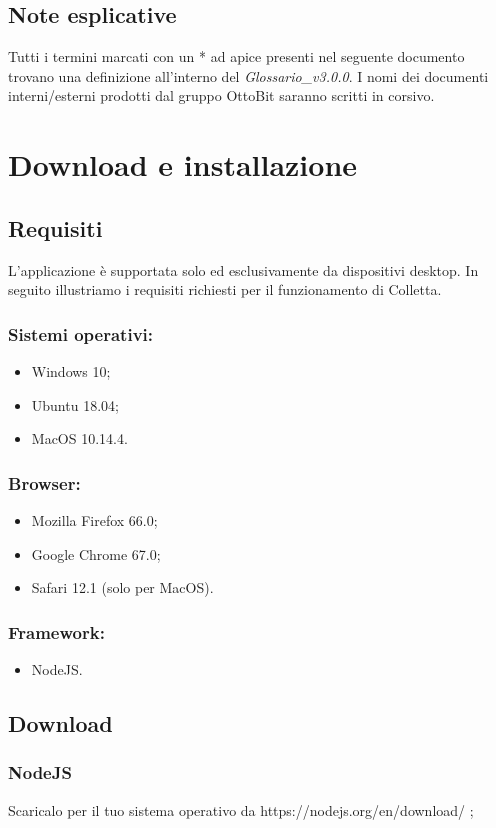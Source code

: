 \documentclass[11pt,a4paper]{article}
\begin{document}
{	\subsection{Note esplicative}
	Tutti i termini marcati con un * ad apice presenti nel seguente documento trovano una definizione
	all’interno del \textit{Glossario\_v3.0.0}.
	I nomi dei documenti interni/esterni prodotti dal gruppo OttoBit saranno scritti in corsivo.
	\newpage
	\section{Download e installazione}
	\subsection{Requisiti}
	L'applicazione è supportata solo ed esclusivamente da dispositivi desktop. In seguito illustriamo i requisiti richiesti per il funzionamento di Colletta.
	\subsubsection{Sistemi operativi:} 
	\begin{itemize}
		\item Windows 10;
		\item Ubuntu 18.04;
		\item MacOS 10.14.4.		
	\end{itemize}
	\subsubsection{Browser:}
		\begin{itemize}
		\item Mozilla Firefox 66.0;
		\item Google Chrome 67.0;
		\item Safari 12.1 (solo per MacOS).		
	\end{itemize}
	\subsubsection{Framework:}
		\begin{itemize}
		\item NodeJS.
		\end{itemize}
	

	\subsection{Download}
	\subsubsection{NodeJS}
	Scaricalo per il tuo sistema operativo da https://nodejs.org/en/download/ ;
}
\end{document}
